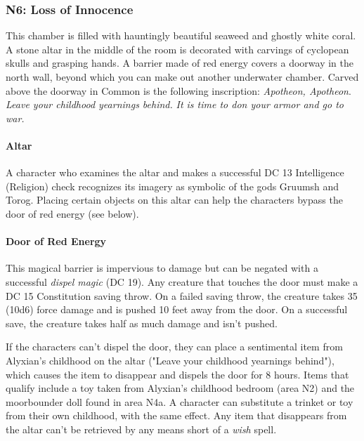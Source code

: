 \documentclass[letterpaper, 11pt, bg=full, twocolumn]{dndbook}
\begin{document}
\subsubsection{N6: Loss of Innocence}

\begin{DndReadAloud}
This chamber is filled with hauntingly beautiful seaweed and ghostly white coral. A stone altar in the middle of the room is decorated with carvings of cyclopean skulls and grasping hands.
A barrier made of red energy covers a doorway in the north wall, beyond which you can make out another underwater chamber. Carved above the doorway in Common is the following inscription:
\textit{Apotheon, Apotheon}.
\textit{Leave your childhood yearnings behind.}
\textit{It is time to don your armor and go to war.}
\end{DndReadAloud}

\paragraph{Altar}

A character who examines the altar and makes a successful DC 13 Intelligence (Religion) check recognizes its imagery as symbolic of the gods Gruumsh and Torog. Placing certain objects on this altar can help the characters bypass the door of red energy (see below).

\paragraph{Door of Red Energy}

This magical barrier is impervious to damage but can be negated with a successful \textit{dispel magic} (DC 19). Any creature that touches the door must make a DC 15 Constitution saving throw. On a failed saving throw, the creature takes 35 (10d6) force damage and is pushed 10 feet away from the door. On a successful save, the creature takes half as much damage and isn't pushed.

If the characters can't dispel the door, they can place a sentimental item from Alyxian's childhood on the altar ("Leave your childhood yearnings behind"), which causes the item to disappear and dispels the door for 8 hours. Items that qualify include a toy taken from Alyxian's childhood bedroom (area N2) and the moorbounder doll found in area N4a. A character can substitute a trinket or toy from their own childhood, with the same effect. Any item that disappears from the altar can't be retrieved by any means short of a \textit{wish} spell.
\end{document}
